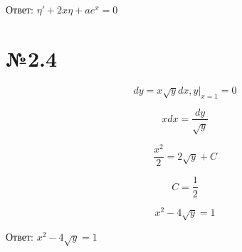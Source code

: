 \documentclass{article}
\begin{document}
Ответ: $\eta' + 2x\eta + ae^x = 0$

\section*{№2.4}

\begin{equation*}
    dy = x\sqrt{y} dx,y|_{x=1} = 0
\end{equation*}

\begin{equation*}
    xdx = \frac{dy}{\sqrt{y}}
\end{equation*}

\begin{equation*}
    \frac{x^2}{2} = 2\sqrt{y} + C
\end{equation*}

\begin{equation*}
    C = \frac{1}{2}
\end{equation*}

\begin{equation*}
    x^2 - 4\sqrt{y} = 1
\end{equation*}

Ответ: $x^2 - 4\sqrt{y} = 1$
\end{document}
